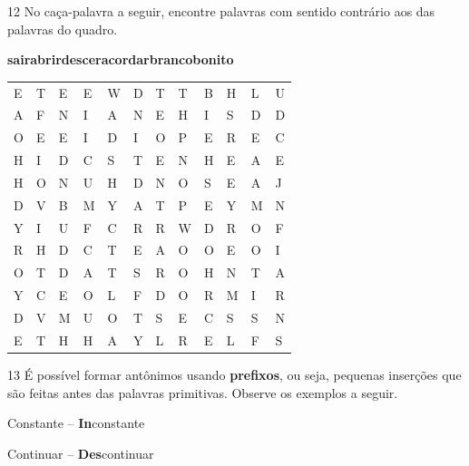 \pagebreak
\num{12} No caça-palavra a seguir, encontre palavras com sentido contrário aos das
palavras do quadro.

\begin{myquote}
\textbf{sair}\hfill \textbf{abrir}\hfill \textbf{descer}\hfill \textbf{acordar}\hfill \textbf{branco}\hfill \textbf{bonito}\hfill
\end{myquote}

\begin{center}
\begin{tabular}{llllllllllll}
E & T & E & E & W & D & T & T & B & H & L & U\\

A & F & N & I & A & N & E & H & I & S & D & D\\

O & E & E & I & D & I & O & P & E & R & E & C\\

H & I & D & C & S & T & E & N & H & E & A & E\\

H & O & N & U & H & D & N & O & S & E & A & J\\

D & V & B & M & Y & A & T & P & E & Y & M & N\\

Y & I & U & F & C & R & R & W & D & R & O & F\\

R & H & D & C & T & E & A & O & O & E & O & I\\

O & T & D & A & T & S & R & O & H & N & T & A\\

Y & C & E & O & L & F & D & O & R & M & I & R\\

D & V & M & U & O & T & S & E & C & S & S & N\\

E & T & H & H & A & Y & L & R & E & L & F & S
\end{tabular}
\end{center}

\num{13} É possível formar antônimos usando \textbf{prefixos}, ou seja, pequenas inserções
que são feitas antes das palavras primitivas. Observe os exemplos a seguir.

\begin{myquote}
Constante -- \textbf{In}constante

Continuar -- \textbf{Des}continuar
\end{myquote}

